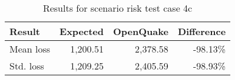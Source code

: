 \begin{table}[htbp]

\centering
\begin{tabular}{ l r r r }

\hline
\rowcolor{anti-flashwhite}
\bf{Result} & \bf{Expected} & \bf{OpenQuake} & \bf{Difference}\\
\hline
Mean loss & 1,200.51 & 2,378.58 & -98.13\% \\
Std. loss & 1,209.25 & 2,405.59 & -98.93\% \\
\hline
\end{tabular}

\caption{Results for scenario risk test case 4c}
\label{tab:result-scenario-risk-4c}
\end{table}